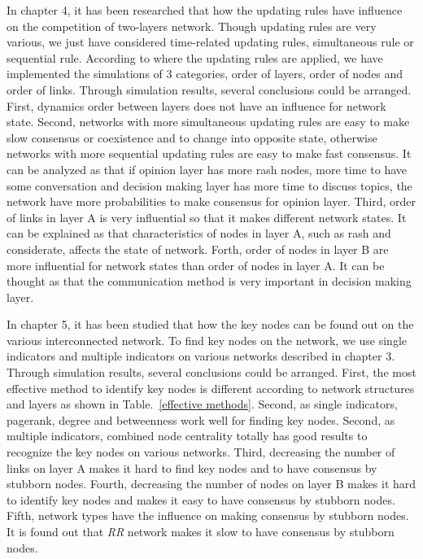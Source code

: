 In chapter 4, it has been researched that how the updating rules have influence on the competition of two-layers network. Though updating rules are very various, we just have considered time-related updating rules, simultaneous rule or sequential rule. According to where the updating rules are applied, we have implemented the simulations of 3 categories, order of layers, order of nodes and order of links. Through simulation results, several conclusions could be arranged. First, dynamics order between layers does not have an influence for network state. Second, networks with more simultaneous updating rules are easy to make slow consensus or coexistence and to change into opposite state, otherwise networks with more sequential updating rules are easy to make fast consensus. It can be analyzed as that if opinion layer has more rash nodes, more time to have some conversation and decision making layer has more time to  discuss topics, the network have more probabilities to make consensus for opinion layer. Third, order of links in layer A is very influential so that it makes different network states. It can be explained as that characteristics of nodes in layer A, such as rash and considerate, affects the state of network. Forth, order of nodes in layer B are more influential for network states than order of nodes in layer A. It can be thought as that the communication method is very important in decision making layer. 

In chapter 5, it has been studied that how the key nodes can be found out on the various interconnected network. To find key nodes on the network, we use single indicators and multiple indicators on various networks described in chapter 3. Through simulation results, several conclusions could be arranged.
First, the most effective method to identify key nodes is different according to network structures and layers as shown in Table.~\ref{effective methods}. Second, as single indicators, pagerank, degree and betweenness work well for finding key nodes. Second, as multiple indicators, combined node centrality totally has good results to recognize the key nodes on various networks. Third, decreasing the number of links on layer A makes it hard to find key nodes and to have consensus by stubborn nodes.  Fourth, decreasing the number of nodes on layer B makes it hard to identify key nodes and makes it easy to have consensus by stubborn nodes. Fifth, network types have the influence on making consensus by stubborn nodes. It is found out that \textit{RR} network makes it slow to have consensus by stubborn nodes. 
  
